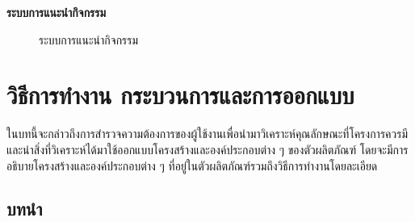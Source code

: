 \documentclass[14pt,oneside,openright,a4paper]{cpe-thai-project}
\begin{document}
\newpage

\large\textbf{ระบบการแนะนำกิจกรรม}

  \begin{figure}[!h]\centering
    \setlength{\fboxrule}{0.5mm} %
    \setlength{\fboxsep}{0.5cm}
    \caption{ระบบการแนะนำกิจกรรม}\label{fig:Suggest}
    \end{figure}

\normalsize
\chapter{วิธีการทำงาน กระบวนการและการออกแบบ}
ในบทนี้จะกล่าวถึงการสำรวจความต้องการของผู้ใช้งานเพื่อนำมาวิเคราะห์คุณลักษณะที่โครงการควรมี และนำสิ่งที่วิเคราะห์ได้มาใช้ออกแบบโครงสร้างและองค์ประกอบต่าง ๆ ของตัวผลิตภัณฑ์ โดยจะมีการอธิบายโครงสร้างและองค์ประกอบต่าง ๆ ที่อยู่ในตัวผลิตภัณฑ์รวมถึงวิธีการทำงานโดยละเอียด
\section{บทนำ}
\end{document}
